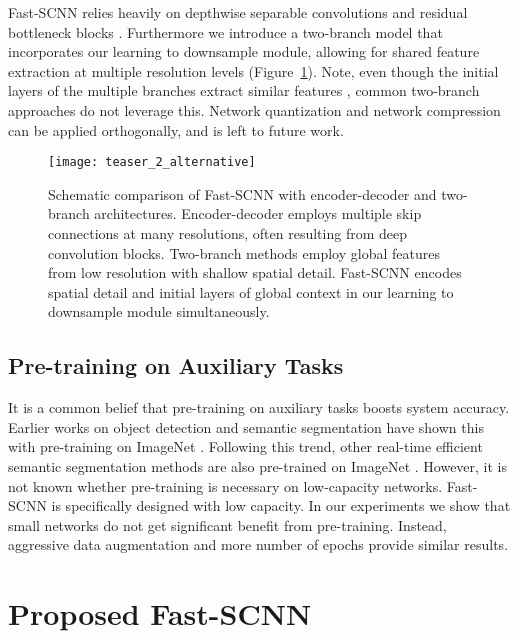 \documentclass[10pt,twocolumn,letterpaper]{article}
\begin{document}
Fast-SCNN relies heavily on depthwise separable convolutions and residual bottleneck blocks \cite{inverted-res-bottlenecks-sandler2018}. Furthermore we introduce a two-branch model that incorporates our learning to downsample module, allowing for shared feature extraction at multiple resolution levels (Figure~\ref{fig:fast-scnn_compare}). Note, even though the initial layers of the  multiple branches extract similar features \cite{deconv-zeiler2014,olah2017}, common two-branch approaches do not leverage this. Network quantization and network compression can be applied orthogonally, and is left to future work.
\begin{figure}[t]
\begin{center}
   \texttt{[image: teaser\_2\_alternative]}
\end{center}
   \caption{Schematic comparison of Fast-SCNN with encoder-decoder and two-branch architectures. Encoder-decoder employs multiple skip connections at many resolutions, often resulting from deep convolution blocks. Two-branch methods employ global features from low resolution with shallow spatial detail. Fast-SCNN encodes spatial detail and initial layers of global context in our learning to downsample module simultaneously.}
\label{fig:fast-scnn_compare}
\end{figure}

\subsection{Pre-training on Auxiliary Tasks}
It is a common belief that pre-training on auxiliary tasks boosts system accuracy. Earlier works on object detection \cite{rcnn-girshick2013} and semantic segmentation \cite{deeplab-v2-chen2016,pspnet-zhao2017a} have shown this with pre-training on ImageNet \cite{imagenet2015}. Following this trend, other real-time efficient semantic segmentation methods are also pre-trained on ImageNet \cite{icnet-zhao2017b,BiSeNet-yu2018,gun-mazzini2018}. However, it is not known whether pre-training is necessary on low-capacity networks. Fast-SCNN is specifically designed with low capacity. In our experiments we show that small networks do not get significant benefit from pre-training. Instead, aggressive data augmentation and more number of epochs provide similar results.


\section{Proposed Fast-SCNN}
\label{sec:fast-seg-net}
\end{document}
